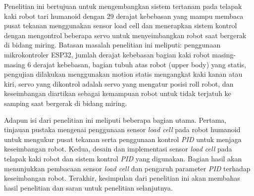 Penelitian ini bertujuan untuk mengembangkan sistem tertanam pada telapak kaki robot tari humanoid dengan 29 derajat kebebasan yang mampu membaca pusat tekanan menggunakan sensor load cell dan menerapkan sistem kontrol dengan mengontrol beberapa servo untuk menyeimbangkan robot saat bergerak di bidang miring. Batasan masalah penelitian ini meliputi: penggunaan mikrokontroler ESP32, jumlah derajat kebebasan bagian kaki robot masing-masing 6 derajat kebebasan, bagian tubuh atas robot (upper body) yang statis, pengujian dilakukan menggunakan motion statis mengangkat kaki kanan atau kiri, servo yang dikontrol adalah servo yang mengatur posisi roll robot, dan keseimbangan diartikan sebagai kemampuan robot untuk tidak terjatuh ke samping saat bergerak di bidang miring.

Adapun isi dari penelitian ini meliputi beberapa bagian utama. Pertama, tinjauan pustaka mengenai penggunaan sensor \emph{load cell} pada robot humanoid untuk mengukur pusat tekanan serta penggunaan kontrol \emph{PID} untuk menjaga keseimbangan robot. Kedua, desain dan implementasi sensor \emph{load cell} pada telapak kaki robot dan sistem kontrol \emph{PID} yang digunakan. Bagian hasil akan menunjukkan pembacaan sensor \emph{load cell} dan pengaruh parameter \emph{PID} terhadap keseimbangan robot. Terakhir, kesimpulan dari penelitian ini akan membahas hasil penelitian dan saran untuk penelitian selanjutnya.